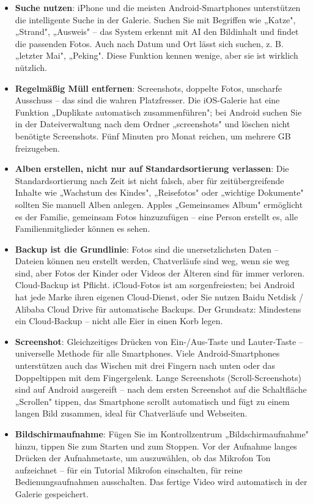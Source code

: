 \begin{itemize}
  \item \textbf{Suche nutzen}: iPhone und die meisten Android-Smartphones unterstützen die intelligente Suche in der Galerie. Suchen Sie mit Begriffen wie „Katze", „Strand", „Ausweis" – das System erkennt mit AI den Bildinhalt und findet die passenden Fotos. Auch nach Datum und Ort lässt sich suchen, z. B. „letzter Mai", „Peking". Diese Funktion kennen wenige, aber sie ist wirklich nützlich.
  \item \textbf{Regelmäßig Müll entfernen}: Screenshots, doppelte Fotos, unscharfe Ausschuss – das sind die wahren Platzfresser. Die iOS-Galerie hat eine Funktion „Duplikate automatisch zusammenführen"; bei Android suchen Sie in der Dateiverwaltung nach dem Ordner „screenshots" und löschen nicht benötigte Screenshots. Fünf Minuten pro Monat reichen, um mehrere GB freizugeben.
  \item \textbf{Alben erstellen, nicht nur auf Standardsortierung verlassen}: Die Standardsortierung nach Zeit ist nicht falsch, aber für zeitübergreifende Inhalte wie „Wachstum des Kindes", „Reisefotos" oder „wichtige Dokumente" sollten Sie manuell Alben anlegen. Apples „Gemeinsames Album" ermöglicht es der Familie, gemeinsam Fotos hinzuzufügen – eine Person erstellt es, alle Familienmitglieder können es sehen.
  \item \textbf{Backup ist die Grundlinie}: Fotos sind die unersetzlichsten Daten – Dateien können neu erstellt werden, Chatverläufe sind weg, wenn sie weg sind, aber Fotos der Kinder oder Videos der Älteren sind für immer verloren. Cloud-Backup ist Pflicht. iCloud-Fotos ist am sorgenfreiesten; bei Android hat jede Marke ihren eigenen Cloud-Dienst, oder Sie nutzen Baidu Netdisk / Alibaba Cloud Drive für automatische Backups. Der Grundsatz: Mindestens ein Cloud-Backup – nicht alle Eier in einen Korb legen.
\end{itemize}


\begin{itemize}
  \item \textbf{Screenshot}: Gleichzeitiges Drücken von Ein-/Aus-Taste und Lauter-Taste – universelle Methode für alle Smartphones. Viele Android-Smartphones unterstützen auch das Wischen mit drei Fingern nach unten oder das Doppeltippen mit dem Fingergelenk. Lange Screenshots (Scroll-Screenshots) sind auf Android ausgereift – nach dem ersten Screenshot auf die Schaltfläche „Scrollen" tippen, das Smartphone scrollt automatisch und fügt zu einem langen Bild zusammen, ideal für Chatverläufe und Webseiten.
  \item \textbf{Bildschirmaufnahme}: Fügen Sie im Kontrollzentrum „Bildschirmaufnahme" hinzu, tippen Sie zum Starten und zum Stoppen. Vor der Aufnahme langes Drücken der Aufnahmetaste, um auszuwählen, ob das Mikrofon Ton aufzeichnet – für ein Tutorial Mikrofon einschalten, für reine Bedienungsaufnahmen ausschalten. Das fertige Video wird automatisch in der Galerie gespeichert.
\end{itemize}


